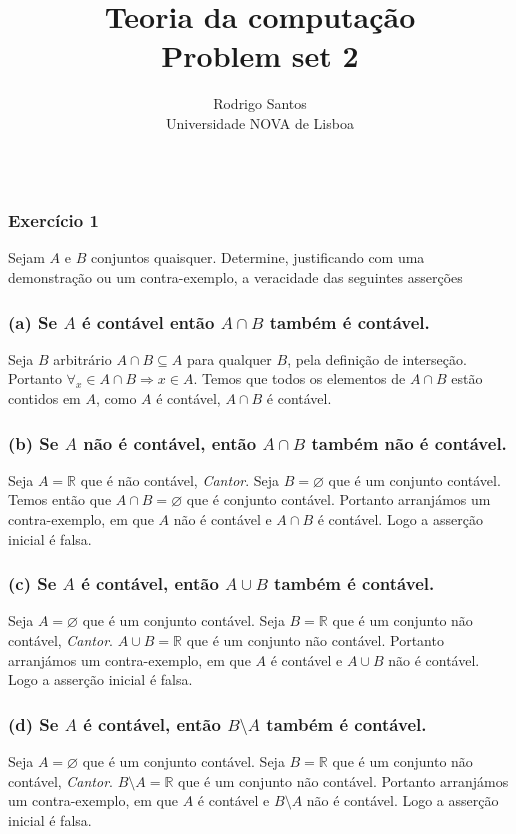\documentclass{article}
\title{Teoria da computação \large \\ Problem set 2}
\author{Rodrigo Santos\\
  \small Universidade NOVA de Lisboa\\\\
}
\date{\vspace{-5ex}}
\begin{document}
\maketitle
\subsubsection*{Exercício 1}
Sejam $A$ e $B$ conjuntos quaisquer. Determine, justificando com uma demonstração ou um contra-exemplo, a veracidade das seguintes asserções

\subsubsection*{(a) Se $A$ é contável então $A \cap B$ também é contável.}
Seja $B$ arbitrário $A \cap B \subseteq A$ para qualquer $B$, pela definição de interseção. Portanto $\forall_x \in A \cap B \Rightarrow x \in A$. Temos que todos os elementos de $A \cap B$ estão contidos em $A$, como $A$ é contável, $A \cap B$ é contável.

\subsubsection*{(b) Se $A$ não é contável, então $A \cap B$ também não é contável.}
Seja $A = \mathbb{R}$ que é não contável, \textit{Cantor}. Seja $B = \varnothing$ que é um conjunto contável. Temos então que $A \cap B = \varnothing$ que é conjunto contável. Portanto arranjámos um contra-exemplo, em que $A$ não é contável e $A \cap B$ é contável. Logo a asserção inicial é falsa.

\subsubsection*{(c) Se $A$ é contável, então $A \cup B$ também é contável.}
Seja $A = \varnothing$ que é um conjunto contável. Seja $B = \mathbb{R}$ que é um conjunto não contável, \textit{Cantor}. $A \cup B = \mathbb{R}$ que é um conjunto não contável. Portanto arranjámos um contra-exemplo, em que $A$ é contável e $A \cup B$ não é contável. Logo a asserção inicial é falsa.

\subsubsection*{(d) Se $A$ é contável, então $B \setminus A$ também é contável.}
Seja $A = \varnothing$ que é um conjunto contável. Seja $B = \mathbb{R}$ que é um conjunto não contável, \textit{Cantor}. $B \setminus A = \mathbb{R}$ que é um conjunto não contável. Portanto arranjámos um contra-exemplo, em que $A$ é contável e $B \setminus A$ não é contável. Logo a asserção inicial é falsa.
\end{document}
